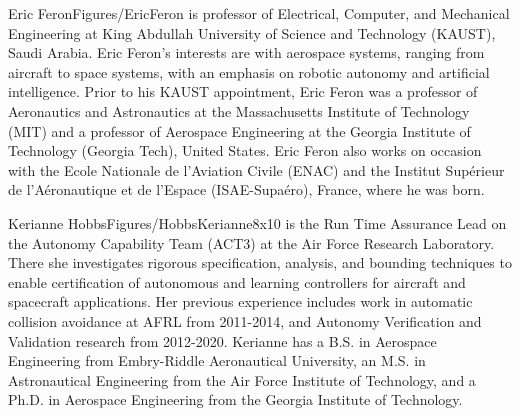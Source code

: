 \documentclass[twocolumn,letterpaper]{IEEEAerospaceCLS}  %
\theoremstyle{definition}
\begin{document}
\begin{biographywithpic}{Eric Feron}{Figures/EricFeron}
is professor of Electrical, Computer, and Mechanical Engineering at King Abdullah University of Science and Technology (KAUST), Saudi Arabia. Eric Feron's interests are with aerospace systems, ranging from aircraft to space systems, with an emphasis on robotic autonomy and artificial intelligence. 
Prior to his KAUST appointment, Eric Feron was a professor of Aeronautics and Astronautics at the Massachusetts Institute of Technology (MIT) and a professor of Aerospace Engineering at the Georgia Institute of Technology (Georgia Tech), United States. Eric Feron also works on occasion with the Ecole Nationale de l'Aviation Civile (ENAC) and the Institut Supérieur de l'Aéronautique et de l'Espace (ISAE-Supaéro), France, where he was born.
\end{biographywithpic}

\begin{biographywithpic}{Kerianne Hobbs}{Figures/HobbsKerianne8x10}
is the Run Time Assurance Lead on the Autonomy Capability Team (ACT3) at the Air Force Research Laboratory. There she investigates rigorous specification, analysis, and bounding techniques to enable certification of autonomous and learning controllers for aircraft and spacecraft applications. Her previous experience includes work in automatic collision avoidance at AFRL from 2011-2014, and Autonomy Verification and Validation research from 2012-2020. Kerianne has a B.S. in Aerospace Engineering from Embry-Riddle Aeronautical University, an M.S. in Astronautical Engineering from the Air Force Institute of Technology, and a Ph.D. in Aerospace Engineering from the Georgia Institute of Technology.
\end{biographywithpic}
\end{document}
